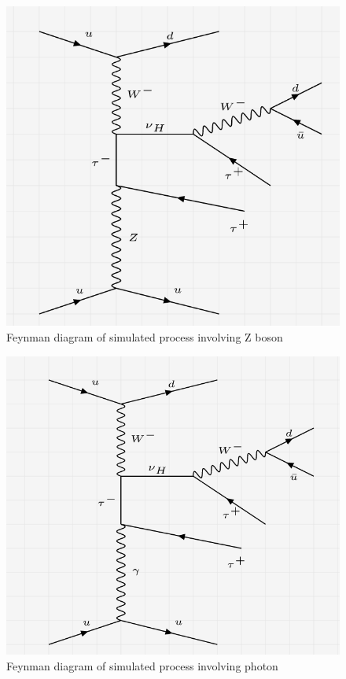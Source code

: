 \documentclass[12pt]{article}
\begin{document}
\begin{figure}[H]
\centering
\includegraphics[scale = 0.45]{Figures/Feynman_hnZ.png}
\caption{Feynman diagram of simulated process involving Z boson}
\label{fig: hnZ}
\end{figure}

\begin{figure}[H]
\centering
\includegraphics[scale = 0.45]{Figures/Feynman_hnGamma.png}
\caption{Feynman diagram of simulated process involving photon}
\label{fig: hnGamma}
\end{figure}
\end{document}
